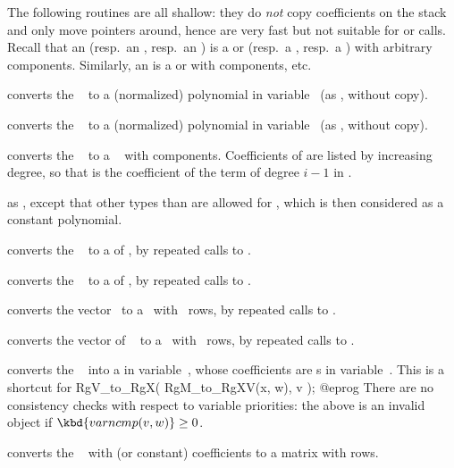 The following routines are all shallow: they do \emph{not} copy coefficients
on the stack and only move pointers around, hence are very fast but not
suitable for  or  calls. Recall that an
 (resp.~an , resp.~an
) is a  or  (resp.~a , resp.~a )
with arbitrary components. Similarly, an  is a  or
 with  components, etc.

 converts the ~ to a
(normalized) polynomial in variable~ (as , without
copy).

 converts the ~
to a (normalized) polynomial in variable~ (as ,
without copy).

 converts the ~ to a
~ with  components. Coefficients of  are listed
by increasing degree, so that  is the coefficient of the term of
degree $i-1$ in .

 as , except that other
types than  are allowed for , which is then considered as a
constant polynomial.

 converts the ~ to a
 of , by repeated calls to .

 converts the ~
to a  of , by repeated calls to .

 converts the vector~ to
a~ with ~rows, by repeated calls to .

 converts the vector of ~
to a~ with ~rows, by repeated calls to .

 converts the ~ into
a  in variable~, whose coefficients are s in
variable~. This is a shortcut for
\bprog
  RgV_to_RgX( RgM_to_RgXV(x, w), v );
@eprog\noindent
There are no consistency checks with respect to variable
priorities: the above is an invalid object if $\kbd{varncmp(v, w)} \geq 0$.

 converts the ~ with
 (or constant) coefficients to a matrix with  rows.

